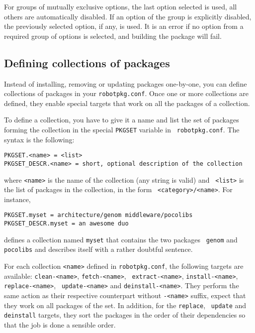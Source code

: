 For groups of mutually exclusive options, the last option selected is used, all
others are automatically  disabled.  If  an option of  the  group is explicitly
disabled, the previously selected option,  if any, is used.   It is an error if
no option from  a  required group  of  options is  selected, and  building  the
package will fail.


\subsection{Defining collections of packages} %

Instead of installing, removing or updating packages one-by-one, you can define
collections  of  packages  in  your  {\tt  robotpkg.conf}.  Once  one  or  more
collections  are defined,  they enable  special targets  that work  on  all the
packages of a collection.

To define a collection, you have to give it a name and list the set of packages
forming  the  collection   in  the  special  {\tt  PKGSET}   variable  in  {\tt
robotpkg.conf}. The syntax is the following:

\begin{verbatim}
PKGSET.<name> = <list>
PKGSET_DESCR.<name> = short, optional description of the collection
\end{verbatim}

where {\tt <name>} is the name of the collection (any string is valid) and {\tt
<list>}  is  the  list  of  packages  in  the  collection,  in  the  form  {\tt
<category>/<name>}. For instance,

\begin{verbatim}
PKGSET.myset = architecture/genom middleware/pocolibs
PKGSET_DESCR.myset = an awesome duo
\end{verbatim}

defines  a collection named  {\tt myset}  that contains  the two  packages {\tt
genom} and {\tt pocolibs} and describes itself with a rather doubtful sentence.

For each collection {\tt <name>}  defined in {\tt robotpkg.conf}, the following
targets   are   available:  {\tt   clean-<name>},   {\tt  fetch-<name>},   {\tt
extract-<name>},    {\tt    install-<name>},    {\tt   replace-<name>},    {\tt
update-<name>}  and {\tt  deinstall-<name>}. They  perform the  same  action as
their  respective counterpart without  {\tt -<name>}  suffix, expect  that they
work on  all packages  of the set.   In addition,  for the {\tt  replace}, {\tt
update} and  {\tt deinstall} targets,  they sort the  packages in the  order of
their dependencies so that the job is done a sensible order.

